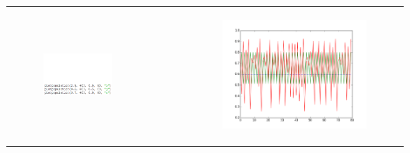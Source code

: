 \documentclass[ignorenonframetext]{beamer}
\begin{document}
\begin{frame}
\begin{tabular}{cr}
\begin{minipage}{0.4\textwidth}
\begin{figure}[htbp]
\vspace*{5pt}
\includegraphics[width = \textwidth]{population-development1-code}
\end{figure}
\end{minipage}

&\begin{minipage}[t]{0.6\textwidth}

\begin{figure}[htbp]
\vspace*{-35pt}
\includegraphics[width = 0.8\textwidth]{population-development1}
\end{figure}
\end{minipage}


\end{tabular}
\end{frame}
\end{document}
